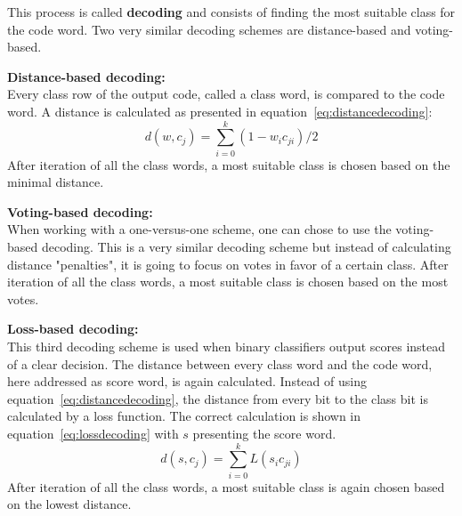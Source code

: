 This process is called \textbf{decoding} and consists of finding the most suitable class for the code word.
Two very similar decoding schemes are distance-based and voting-based.
\par 
\textbf{Distance-based decoding:}\\
Every class row of the output code, called a class word, is compared to the code word.
A distance is calculated as presented in equation~\ref{eq:distancedecoding}:\\
\begin{equation}
	d(w,c_j)=\sum_{i=0}^{k} \left( 1 - w_i c_{ji}\right)/2
	\label{eq:distancedecoding}
\end{equation}
After iteration of all the class words, a most suitable class is chosen based on the minimal distance.
\par 
\textbf{Voting-based decoding:}\\
When working with a one-versus-one scheme, one can chose to use the voting-based decoding.
This is a very similar decoding scheme but instead of calculating distance "penalties", it is going to focus on votes in favor of a certain class.
After iteration of all the class words, a most suitable class is chosen based on the most votes.
\par 
\textbf{Loss-based decoding:}\\
This third decoding scheme is used when binary classifiers output scores instead of a clear decision.
The distance between every class word and the code word, here addressed as score word, is again calculated.
Instead of using equation~\ref{eq:distancedecoding}, the distance from every bit to the class bit is calculated by a loss function.
The correct calculation is shown in equation~\ref{eq:lossdecoding} with $s$ presenting the score word.
\begin{equation}
	d(s,c_j)=\sum_{i=0}^{k} L(s_i c_{ji})
	\label{eq:lossdecoding}
\end{equation}
After iteration of all the class words, a most suitable class is again chosen based on the lowest distance.

